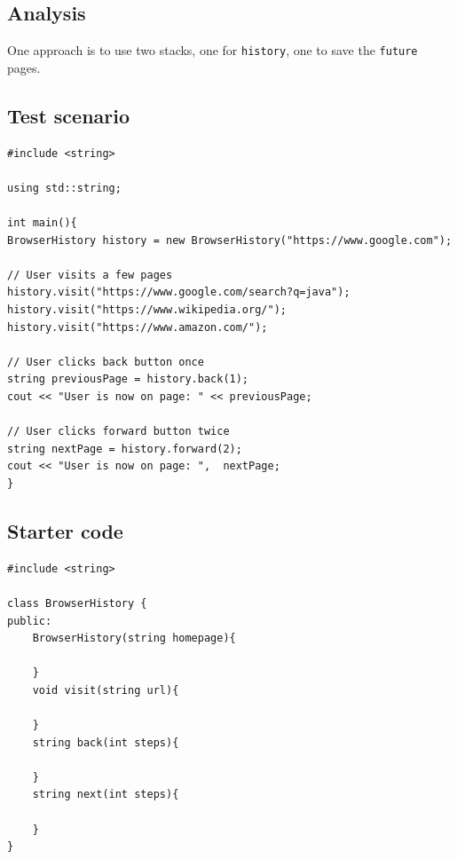 \documentclass[11pt]{article}
\begin{document}
\subsection{Analysis}
\label{sec:orga3281dd}
One approach is to use two stacks, one for \texttt{history}, one to save the \texttt{future} pages.

\subsection{Test scenario}
\label{sec:org69fc44c}
\begin{verbatim}
#include <string>

using std::string;

int main(){
BrowserHistory history = new BrowserHistory("https://www.google.com");

// User visits a few pages
history.visit("https://www.google.com/search?q=java");
history.visit("https://www.wikipedia.org/");
history.visit("https://www.amazon.com/");

// User clicks back button once
string previousPage = history.back(1);
cout << "User is now on page: " << previousPage;

// User clicks forward button twice
string nextPage = history.forward(2);
cout << "User is now on page: ",  nextPage;
}
\end{verbatim}

\subsection{Starter code}
\label{sec:orgf9c0d45}
\begin{verbatim}
#include <string>

class BrowserHistory {
public:
    BrowserHistory(string homepage){

    }
    void visit(string url){

    }
    string back(int steps){

    }
    string next(int steps){

    }
}
\end{verbatim}
\end{document}
